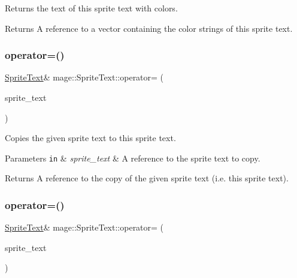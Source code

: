 Returns the text of this sprite text with colors.

\begin{DoxyReturn}{Returns}
A reference to a vector containing the color strings of this sprite text. 
\end{DoxyReturn}
\hypertarget{classmage_1_1_sprite_text_af027a281c1fa600dd870ca04d91fcae8}{}\label{classmage_1_1_sprite_text_af027a281c1fa600dd870ca04d91fcae8} 
\subsubsection{\texorpdfstring{operator=()}{operator=()}\hspace{0.1cm}{\footnotesize\ttfamily [1/2]}}
{\footnotesize\ttfamily \hyperlink{classmage_1_1_sprite_text}{Sprite\+Text}\& mage\+::\+Sprite\+Text\+::operator= (\begin{DoxyParamCaption}\item[{const \hyperlink{classmage_1_1_sprite_text}{Sprite\+Text} \&}]{sprite\+\_\+text }\end{DoxyParamCaption})\hspace{0.3cm}{\ttfamily [delete]}}

Copies the given sprite text to this sprite text.


\begin{DoxyParams}[1]{Parameters}
\mbox{\tt in}  & {\em sprite\+\_\+text} & A reference to the sprite text to copy. \\
\hline
\end{DoxyParams}
\begin{DoxyReturn}{Returns}
A reference to the copy of the given sprite text (i.\+e. this sprite text). 
\end{DoxyReturn}
\hypertarget{classmage_1_1_sprite_text_a7e2e165d7682d9cc623b7c9725f76920}{}\label{classmage_1_1_sprite_text_a7e2e165d7682d9cc623b7c9725f76920} 
\subsubsection{\texorpdfstring{operator=()}{operator=()}\hspace{0.1cm}{\footnotesize\ttfamily [2/2]}}
{\footnotesize\ttfamily \hyperlink{classmage_1_1_sprite_text}{Sprite\+Text}\& mage\+::\+Sprite\+Text\+::operator= (\begin{DoxyParamCaption}\item[{\hyperlink{classmage_1_1_sprite_text}{Sprite\+Text} \&\&}]{sprite\+\_\+text }\end{DoxyParamCaption})\hspace{0.3cm}{\ttfamily [delete]}}

